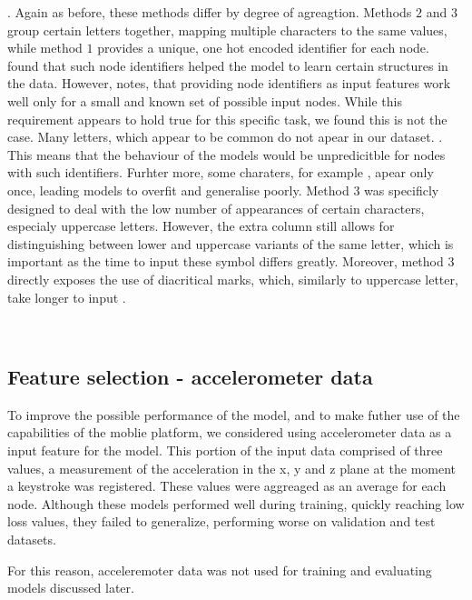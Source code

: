 .
Again as before, these methods differ by degree of agreagtion. Methods $2$ and $3$ group certain letters together, mapping multiple characters to the same values, while method $1$ provides a unique, one hot encoded identifier for each node.  found that such node identifiers helped the model to learn certain structures in the data. However,  notes, that providing node identifiers as input features work well only for a small and known set of possible input nodes. While this requirement appears to hold true for this specific task, we found this is not the case. Many letters, which appear to be common do not apear in our dataset. . This means that the behaviour of the models would be unpredicitble for nodes with such identifiers.
Furhter more, some charaters, for example , apear only once, leading models to overfit and generalise poorly.
Method $3$ was specificly designed to deal with the low number of appearances of certain characters, especialy uppercase letters. However, the extra column still allows for distinguishing between lower and uppercase variants of the same letter, which is important as the time to input these symbol differs greatly. 
Moreover, method $3$ directly exposes the use of diacritical marks, which, similarly to uppercase letter, take longer to input . 

\\


\subsection{Feature selection - accelerometer data}
To improve the possible performance of the model, and to make futher use of the capabilities of the moblie platform, we considered using accelerometer data as a input feature for the model.
This portion of the input data comprised of three values, a measurement of the acceleration in the x, y and z plane at the moment a keystroke was registered. 
These values were aggreaged as an average for each node. Although these models performed well during training, quickly reaching low loss values, they failed to generalize, performing worse on 
validation and test datasets. 

For this reason, acceleremoter data was not used for training and evaluating models discussed later.


